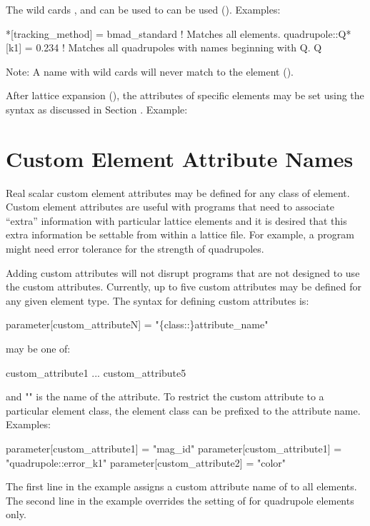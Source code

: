 {{The wild cards , and  can be used to can be used
(). Examples:
\begin{example}
  *[tracking_method] = bmad_standard  ! Matches all elements.
  quadrupole::Q*[k1] = 0.234    ! Matches all quadrupoles with names beginning with Q.
  Q%
\end{example}
Note: A name with wild cards will never match to the  element ().

After lattice expansion (), the attributes of specific elements
may be set using the syntax as discussed in Section . Example:

\section{Custom Element Attribute Names}
\label{s:custom.attrib}

Real scalar custom element attributes may be defined for any class of
element.  Custom element attributes are useful with programs that need
to associate ``extra'' information with particular lattice elements
and it is desired that this extra information be settable from within
a lattice file. For example, a program might need error tolerance
for the strength of quadrupoles.

Adding custom attributes will not disrupt programs that are not
designed to use the custom attributes. Currently, up to five custom
attributes may be defined for any given element type. The syntax for
defining custom attributes is:
\begin{example}
  parameter[custom_attributeN] = "\{class::\}attribute_name"
\end{example}
 may be one of:
\begin{example}
  custom_attribute1
  ...
  custom_attribute5
\end{example}
and "" is the name of the attribute. To restrict the
custom attribute to a particular element class, the element class
can be prefixed to the attribute name. Examples:
\begin{example}
  parameter[custom_attribute1] = "mag_id"
  parameter[custom_attribute1] = "quadrupole::error_k1"
  parameter[custom_attribute2] = "color"
\end{example}
The first line in the example assigns a custom attribute name of
 to all elements.  The second line in the example overrides
the setting of  for quadrupole elements only. 

}}
